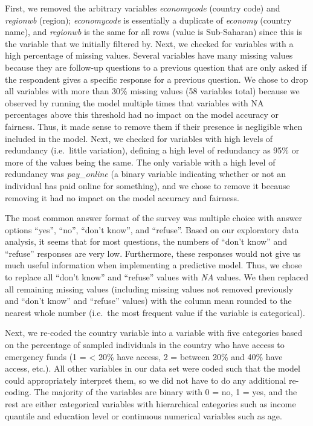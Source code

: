 \documentclass[water,article,submit,moreauthors,pdftex]{mdpi}
\begin{document}
First, we removed the arbitrary variables \emph{economycode} (country
code) and \emph{regionwb} (region); \emph{economycode} is essentially a
duplicate of \emph{economy} (country name), and \emph{regionwb} is the
same for all rows (value is Sub-Saharan) since this is the variable that
we initially filtered by. Next, we checked for variables with a high
percentage of missing values. Several variables have many missing values
because they are follow-up questions to a previous question that are
only asked if the respondent gives a specific response for a previous
question. We chose to drop all variables with more than 30\% missing
values (58 variables total) because we observed by running the model
multiple times that variables with NA percentages above this threshold
had no impact on the model accuracy or fairness. Thus, it made sense to
remove them if their presence is negligible when included in the model.
Next, we checked for variables with high levels of redundancy
(i.e.~little variation), defining a high level of redundancy as 95\% or
more of the values being the same. The only variable with a high level
of redundancy was \emph{pay\_online} (a binary variable indicating
whether or not an individual has paid online for something), and we
chose to remove it because removing it had no impact on the model
accuracy and fairness.

The most common answer format of the survey was multiple choice with
answer options ``yes'', ``no'', ``don't know'', and ``refuse''. Based on
our exploratory data analysis, it seems that for most questions, the
numbers of ``don't know'' and ``refuse'' responses are very low.
Furthermore, these responses would not give us much useful information
when implementing a predictive model. Thus, we chose to replace all
``don't know'' and ``refuse'' values with \emph{NA} values. We then
replaced all remaining missing values (including missing values not
removed previously and ``don't know'' and ``refuse'' values) with the
column mean rounded to the nearest whole number (i.e.~the most frequent
value if the variable is categorical).

Next, we re-coded the country variable into a variable with five
categories based on the percentage of sampled individuals in the country
who have access to emergency funds (1 = \textless{} 20\% have access, 2
= between 20\% and 40\% have access, etc.). All other variables in our
data set were coded such that the model could appropriately interpret
them, so we did not have to do any additional re-coding. The majority of
the variables are binary with 0 = no, 1 = yes, and the rest are either
categorical variables with hierarchical categories such as income
quantile and education level or continuous numerical variables such as
age.
\end{document}
